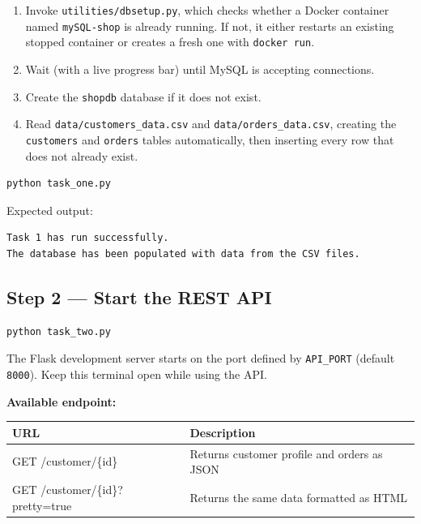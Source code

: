 \documentclass[12pt,a4paper]{article}
\begin{document}
\begin{enumerate}[leftmargin=2em]
    \item Invoke \texttt{utilities/dbsetup.py}, which checks whether a Docker
          container named \texttt{mySQL-shop} is already running. If not, it
          either restarts an existing stopped container or creates a fresh one
          with \texttt{docker run}.
    \item Wait (with a live progress bar) until MySQL is accepting connections.
    \item Create the \texttt{shopdb} database if it does not exist.
    \item Read \texttt{data/customers\_data.csv} and
          \texttt{data/orders\_data.csv}, creating the \texttt{customers} and
          \texttt{orders} tables automatically, then inserting every row that
          does not already exist.
\end{enumerate}

\begin{lstlisting}[language=bash, caption={Populate the database}]
python task_one.py
\end{lstlisting}

Expected output:
\begin{lstlisting}[caption={Successful run output}]
Task 1 has run successfully.
The database has been populated with data from the CSV files.
\end{lstlisting}

\subsection{Step 2 --- Start the REST API}

\begin{lstlisting}[language=bash, caption={Start the Flask API server}]
python task_two.py
\end{lstlisting}

The Flask development server starts on the port defined by \texttt{API\_PORT}
(default \texttt{8000}). Keep this terminal open while using the API.

\textbf{Available endpoint:}

\begin{center}
\begin{tabular}{>{\ttfamily}l l}
\toprule
\textbf{URL} & \textbf{Description} \\
\midrule
GET /customer/\{id\}            & Returns customer profile and orders as JSON \\
GET /customer/\{id\}?pretty=true & Returns the same data formatted as HTML \\
\bottomrule
\end{tabular}
\end{center}
\end{document}
